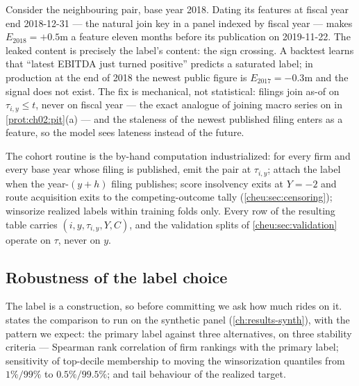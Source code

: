 \begin{warning}\label{warn:success-unpublished}
Consider the neighbouring pair, base year 2018. Dating its features at fiscal year end
2018-12-31 --- the natural join key in a panel indexed by fiscal year --- makes $E_{2018} =
+0.5$m a feature eleven months before its publication on 2019-11-22. The leaked content is
precisely the label's content: the sign crossing. A backtest learns that ``latest EBITDA just
turned positive'' predicts a saturated label; in production at the end of 2018 the newest public
figure is $E_{2017} = -0.3$m and the signal does not exist. The fix is mechanical, not
statistical: filings join as-of on $\tau_{i,y} \le t$, never on fiscal year --- the exact
analogue of joining macro series on  in \cref{prot:ch02:pit}(a) --- and the
staleness of the newest published filing enters as a feature, so the model sees lateness instead
of the future.
\end{warning}

The cohort routine is the by-hand computation industrialized: for every firm and every base year
whose filing is published, emit the pair at $\tau_{i,y}$; attach the label when the
year-$(y{+}h)$ filing publishes; score insolvency exits at $Y = -2$ and route acquisition exits
to the competing-outcome tally (\cref{cheu:sec:censoring}); winsorize realized labels within
training folds only. Every row of the resulting table carries $(i, y, \tau_{i,y}, Y, C)$, and
the validation splits of \cref{cheu:sec:validation} operate on $\tau$, never on $y$.

\subsection{Robustness of the label choice}\label{cheu:sec:robust}

The label is a construction, so before committing we ask how much rides on it.
 states the comparison to run on the synthetic panel
(\cref{ch:results-synth}), with the pattern we expect: the primary label against three
alternatives, on three stability criteria --- Spearman rank correlation of firm rankings with
the primary label; sensitivity of top-decile membership to moving the winsorization quantiles
from $1\%/99\%$ to $0.5\%/99.5\%$; and tail behaviour of the realized target.

